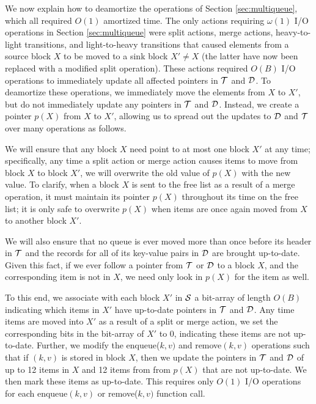 \documentclass[11pt,letterpaper]{article}
\begin{document}
We now explain how to deamortize the operations of Section \ref{sec:multiqueue}, which all required $O(1)$ amortized time. 
The only actions requiring $\omega(1)$ I/O operations in Section \ref{sec:multiqueue} were split actions, merge actions, heavy-to-light transitions, and
light-to-heavy transitions that caused elements from a source block $X$ to be moved to a sink block $X' \neq X$ (the latter have now been replaced with a modified split operation). These actions
required $O(B)$ I/O operations to immediately update all affected pointers in $\cal T$ and $\cal D$.
To deamortize these operations, we immediately move the elements from $X$ to $X'$, but do not immediately update 
any pointers in $\cal T$ and $\cal D$. Instead, we create a pointer $p(X)$ from $X$ to $X'$,
allowing us to spread out
the updates to $\cal D$ and $\cal T$ over many operations as follows. 

We will ensure that any block $X$
need point to at most one block $X'$ at any time; specifically, any time a split action or merge action
causes items to move from block $X$ to block $X'$, we will overwrite the old value of $p(X)$ with the new value. To clarify, when a block $X$ is sent to the free list as a result of 
a merge operation, it must maintain its pointer $p(X)$ throughout its time on the free list; it is only safe to overwrite $p(X)$ when items are 
once again moved
from $X$ to another block $X'$.

We will also ensure that no queue is ever moved more than once before its header in $\cal T$ and the records for all of its
key-value pairs in $\cal D$ are brought up-to-date. Given this fact, 
if we ever follow a pointer from $\cal T$ or $\cal D$ to a block $X$, and the corresponding
item is not in $X$, we need only look in $p(X)$ for the item as well. 

To this end, we associate with each block $X'$ in $\cal S$ a bit-array of length $O(B)$ indicating which items in
$X'$ have up-to-date pointers in $\cal T$ and $\cal D$. Any time items are moved into $X'$ as a result
of a split or merge action, we set the corresponding bits in the bit-array of $X'$ to 0, indicating
these items are not up-to-date. Further, we modify the
enqueue($k,v)$ and remove$(k, v)$ operations such that if $(k, v)$ is stored in block $X$, then we 
update the pointers in $\cal T$ and $\cal D$
of up to 12 items in $X$ and 12 items from
from $p(X)$ that are not up-to-date. We then mark these items as up-to-date. This requires only $O(1)$ I/O operations for each enqueue$(k,v)$ or remove($k,v)$
function call.
\end{document}
